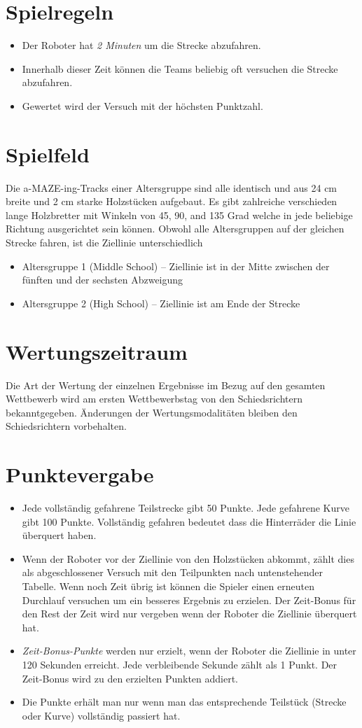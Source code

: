\documentclass[a4paper,12pt]{article}
\begin{document}
\section{Spielregeln}
\begin{itemize}
\item Der Roboter hat \emph{2 Minuten} um die Strecke abzufahren.
\item Innerhalb dieser Zeit können die Teams beliebig oft versuchen die Strecke abzufahren.
\item Gewertet wird der Versuch mit der höchsten Punktzahl.
\end{itemize}
\section{Spielfeld}
Die a-MAZE-ing-Tracks einer Altersgruppe sind alle identisch und aus 24 cm breite und 2 cm starke
Holzstücken aufgebaut. Es gibt zahlreiche verschieden lange Holzbretter mit Winkeln von 45, 90, and 135
Grad welche in jede beliebige Richtung ausgerichtet sein können.
Obwohl alle Altersgruppen auf der gleichen Strecke fahren, ist die Ziellinie unterschiedlich
\begin{itemize}
\item Altersgruppe 1 (Middle School) – Ziellinie ist in der Mitte zwischen der fünften und der sechsten Abzweigung
\item Altersgruppe 2 (High School) – Ziellinie ist am Ende der Strecke
\end{itemize}
\section{Wertungszeitraum}
\par Die Art der Wertung der einzelnen Ergebnisse im Bezug auf den gesamten Wettbewerb wird am ersten Wettbewerbstag von den Schiedsrichtern bekanntgegeben. Änderungen der Wertungsmodalitäten bleiben den Schiedsrichtern vorbehalten.
\section{Punktevergabe}
\begin{itemize}
\item Jede vollständig gefahrene Teilstrecke gibt 50 Punkte. Jede gefahrene Kurve gibt 100 Punkte. Vollständig gefahren bedeutet dass die Hinterräder die Linie überquert haben.
\item Wenn der Roboter vor der Ziellinie von den Holzstücken abkommt, zählt dies als abgeschlossener Versuch mit den Teilpunkten nach untenstehender Tabelle. Wenn noch Zeit übrig ist können die Spieler einen erneuten Durchlauf versuchen um ein besseres Ergebnis zu erzielen. Der Zeit-Bonus für den Rest der Zeit  wird nur vergeben wenn der Roboter die Ziellinie überquert hat.
\item \emph{Zeit-Bonus-Punkte} werden nur erzielt, wenn der Roboter die Ziellinie in unter 120 Sekunden erreicht. Jede
verbleibende Sekunde zählt als 1 Punkt. Der Zeit-Bonus wird zu den erzielten Punkten addiert.
\item Die Punkte erhält man nur wenn man das entsprechende Teilstück (Strecke oder Kurve) vollständig passiert hat.
\end{itemize}
\end{document}
